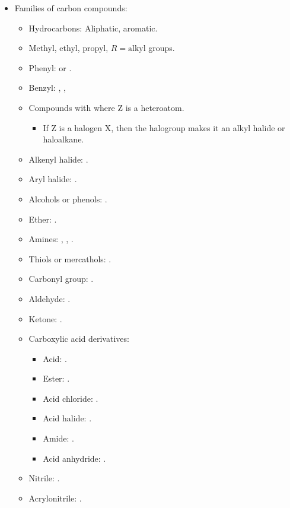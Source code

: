 \documentclass[../notes.tex]{subfiles}
\begin{document}
\begin{itemize}
    \item Families of carbon compounds:
    \begin{itemize}
        \item Hydrocarbons: Aliphatic, aromatic.
        \item Methyl, ethyl, propyl, $R=\text{alkyl}$ groups.
        \item Phenyl:  or \ce{$\phi${-}}.
        \item Benzyl: , , 
        \item Compounds with  where Z is a heteroatom.
        \begin{itemize}
            \item If Z is a halogen X, then the halogroup makes it an alkyl halide or haloalkane.
        \end{itemize}
        \item Alkenyl halide: .
        \item Aryl halide: .
        \item Alcohols or phenols: .
        \item Ether: .
        \item Amines: , , .
        \item Thiols or mercathols: .
        \item Carbonyl group: .
        \item Aldehyde: .
        \item Ketone: .
        \item Carboxylic acid derivatives:
        \begin{itemize}
            \item Acid: .
            \item Ester: .
            \item Acid chloride: .
            \item Acid halide: .
            \item Amide: .
            \item Acid anhydride: .
        \end{itemize}
        \item Nitrile: .
        \item Acrylonitrile: .
    \end{itemize}
\end{itemize}
\end{document}
